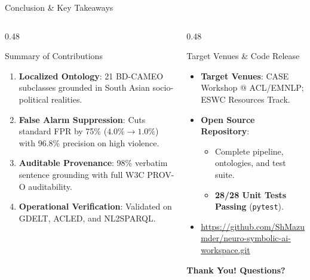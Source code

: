 \documentclass[aspectratio=169, 10pt]{beamer}
\begin{document}
\begin{frame}{Conclusion \& Key Takeaways}
  \begin{columns}[T]
    \begin{column}{0.48\textwidth}
      \begin{block}{Summary of Contributions}
        \begin{enumerate}
          \item \textbf{Localized Ontology}: 21 BD-CAMEO subclasses grounded in South Asian socio-political realities.
          \item \textbf{False Alarm Suppression}: Cuts standard FPR by 75\% ($4.0\% \to 1.0\%$) with 96.8\% precision on high violence.
          \item \textbf{Auditable Provenance}: 98\% verbatim sentence grounding with full W3C PROV-O auditability.
          \item \textbf{Operational Verification}: Validated on GDELT, ACLED, and NL2SPARQL.
        \end{enumerate}
      \end{block}
    \end{column}
    \begin{column}{0.48\textwidth}
      \begin{block}{Target Venues \& Code Release}
        \begin{itemize}
          \item \textbf{Target Venues}: CASE Workshop @ ACL/EMNLP; ESWC Resources Track.
          \item \textbf{Open Source Repository}:
            \begin{itemize}
              \item Complete pipeline, ontologies, and test suite.
              \item \textbf{28/28 Unit Tests Passing} (\texttt{pytest}).
            \end{itemize}
          \item \url{https://github.com/ShMazumder/neuro-symbolic-ai-workspace.git}
        \end{itemize}
      \end{block}
      \vspace{0.8em}
      \centering
      \textbf{\large Thank You! Questions?}
    \end{column}
  \end{columns}
\end{frame}
\end{document}
